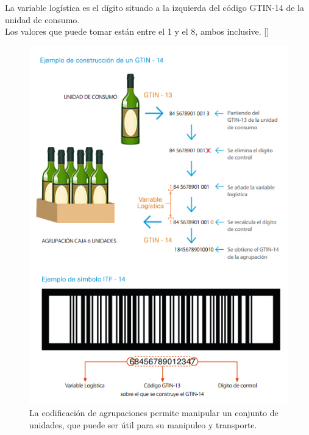 La variable logística es el dígito situado a la izquierda del código GTIN-14 de la unidad de consumo.\\

Los valores que puede tomar están entre el 1 y el 8, ambos inclusive. [\citep{CCCB:2019:Online}]

\begin{figure}
  \centering
    \includegraphics[scale=0.8]{./Capitulo2/figs/codificacion_agrupaciones_post_barras.jpg}
  \caption{La codificación de agrupaciones permite manipular un conjunto de unidades, que puede ser útil para su manipuleo y transporte.}
  \label{codificacion_agrupaciones_post_barras}
\end{figure}
